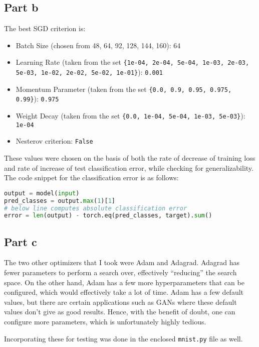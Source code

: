 \documentclass{article}
\begin{document}
\subsection*{Part b}
\begin{flushleft}
The best SGD criterion is:
\begin{itemize}
\item Batch Size (chosen from 48, 64, 92, 128, 144, 160): 64
\item Learning Rate (taken from the set \texttt{\{1e-04, 2e-04, 5e-04, 1e-03, 2e-03, 5e-03, 1e-02, 2e-02, 5e-02, 1e-01\}}): \texttt{0.001}
\item Momentum Parameter (taken from the set \texttt{\{0.0, 0.9, 0.95, 0.975, 0.99\}}): \texttt{0.975}
\item Weight Decay (taken from the set \texttt{\{0.0, 1e-04, 5e-04, 1e-03, 5e-03\}}): \texttt{1e-04}
\item Nesterov criterion: \texttt{False}
\end{itemize}

These values were chosen on the basis of both the rate of decrease of training loss and rate of increase of test classification error, while checking for generalizability. The code snippet for the classification error is as follows:
\begin{lstlisting}[language=Python]
output = model(input)
pred_classes = output.max(1)[1]
# below line computes absolute classification error
error = len(output) - torch.eq(pred_classes, target).sum()
\end{lstlisting}
\end{flushleft}

\subsection*{Part c}
\begin{flushleft}
The two other optimizers that I took were Adam and Adagrad. Adagrad has fewer parameters to perform a search over, effectively ``reducing'' the search space. On the other hand, Adam has a few more hyperparameters that can be configured, which would effectively take a lot of time. Adam has a few default values, but there are certain applications such as GANs where these default values don't give as good results. Hence, with the benefit of doubt, one can configure more parameters, which is unfortunately highly tedious.

Incorporating these for testing was done in the enclosed \texttt{mnist.py} file as well.
\end{flushleft}
\end{document}
